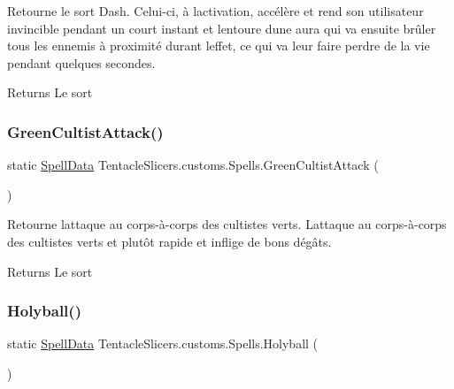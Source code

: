 Retourne le sort Dash. Celui-\/ci, à l\textquotesingle{}activation, accélère et rend son utilisateur invincible pendant un court instant et l\textquotesingle{}entoure d\textquotesingle{}une aura qui va ensuite brûler tous les ennemis à proximité durant l\textquotesingle{}effet, ce qui va leur faire perdre de la vie pendant quelques secondes. 

\begin{DoxyReturn}{Returns}
Le sort 
\end{DoxyReturn}
\mbox{\label{class_tentacle_slicers_1_1customs_1_1_spells_a766be599caf989c80cfe9b892d9e9999}} 
\subsubsection{\texorpdfstring{Green\+Cultist\+Attack()}{GreenCultistAttack()}}
{\footnotesize\ttfamily static \hyperlink{class_tentacle_slicers_1_1spells_1_1_spell_data}{Spell\+Data} Tentacle\+Slicers.\+customs.\+Spells.\+Green\+Cultist\+Attack (\begin{DoxyParamCaption}{ }\end{DoxyParamCaption})\hspace{0.3cm}{\ttfamily [static]}}



Retourne l\textquotesingle{}attaque au corps-\/à-\/corps des cultistes verts. L\textquotesingle{}attaque au corps-\/à-\/corps des cultistes verts et plutôt rapide et inflige de bons dégâts. 

\begin{DoxyReturn}{Returns}
Le sort 
\end{DoxyReturn}
\mbox{\label{class_tentacle_slicers_1_1customs_1_1_spells_a6d0ec159b32ab1924fcceb617b801f57}} 
\subsubsection{\texorpdfstring{Holyball()}{Holyball()}}
{\footnotesize\ttfamily static \hyperlink{class_tentacle_slicers_1_1spells_1_1_spell_data}{Spell\+Data} Tentacle\+Slicers.\+customs.\+Spells.\+Holyball (\begin{DoxyParamCaption}{ }\end{DoxyParamCaption})\hspace{0.3cm}{\ttfamily [static]}}




